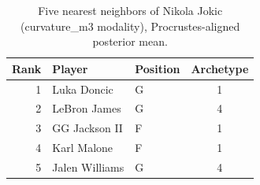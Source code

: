 \begin{table}[htbp]
  \centering\small
  \begin{tabular}{rllc}
    \toprule
    Rank & Player & Position & Archetype \\
    \midrule
    1 & Luka Doncic & G & 1 \\
    2 & LeBron James & G & 4 \\
    3 & GG Jackson II & F & 1 \\
    4 & Karl Malone & F & 1 \\
    5 & Jalen Williams & G & 4 \\
    \bottomrule
  \end{tabular}
  \caption{Five nearest neighbors of Nikola Jokic (curvature_m3 modality), Procrustes-aligned posterior mean.}
  \label{tab:Nikola_Jokic_neighbors_curvature_m3}
\end{table}

